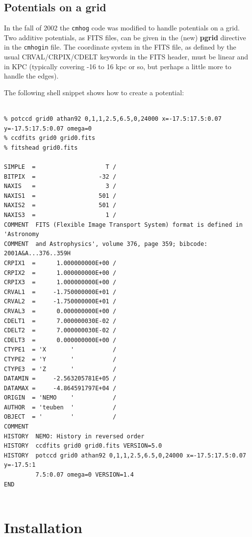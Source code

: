 \documentclass[10pt,dvips]{article}
\begin{document}
\subsection{Potentials on a grid}

In the fall of 2002 the {\tt cmhog} code was modified to handle potentials
on a grid. Two additive potentials, as FITS files, can be given in the
(new) {\bf pgrid} directive in the {\tt cmhogin} file. The coordinate
system in the FITS file, as defined by the usual CRVAL/CRPIX/CDELT keywords
in the FITS header, must be linear and in KPC (typically covering -16 to
16 kpc or so, but perhaps a little more to handle the edges). 

The following shell snippet shows how to create a potential:


\begin{verbatim}

% potccd grid0 athan92 0,1,1,2.5,6.5,0,24000 x=-17.5:17.5:0.07 y=-17.5:17.5:0.07 omega=0
% ccdfits grid0 grid0.fits 
% fitshead grid0.fits

SIMPLE  =                    T /
BITPIX  =                  -32 /
NAXIS   =                    3 /
NAXIS1  =                  501 /
NAXIS2  =                  501 /
NAXIS3  =                    1 /
COMMENT  FITS (Flexible Image Transport System) format is defined in 'Astronomy
COMMENT  and Astrophysics', volume 376, page 359; bibcode: 2001A&A...376..359H
CRPIX1  =      1.000000000E+00 /
CRPIX2  =      1.000000000E+00 /
CRPIX3  =      1.000000000E+00 /
CRVAL1  =     -1.750000000E+01 /
CRVAL2  =     -1.750000000E+01 /
CRVAL3  =      0.000000000E+00 /
CDELT1  =      7.000000030E-02 /
CDELT2  =      7.000000030E-02 /
CDELT3  =      0.000000000E+00 /
CTYPE1  = 'X       '           /
CTYPE2  = 'Y       '           /
CTYPE3  = 'Z       '           /
DATAMIN =     -2.563205781E+05 /
DATAMAX =     -4.864591797E+04 /
ORIGIN  = 'NEMO    '           /
AUTHOR  = 'teuben  '           /
OBJECT  = '        '           /
COMMENT
HISTORY  NEMO: History in reversed order
HISTORY  ccdfits grid0 grid0.fits VERSION=5.0
HISTORY  potccd grid0 athan92 0,1,1,2.5,6.5,0,24000 x=-17.5:17.5:0.07 y=-17.5:1
         7.5:0.07 omega=0 VERSION=1.4
END


\end{verbatim}



\section{Installation}
\end{document}
